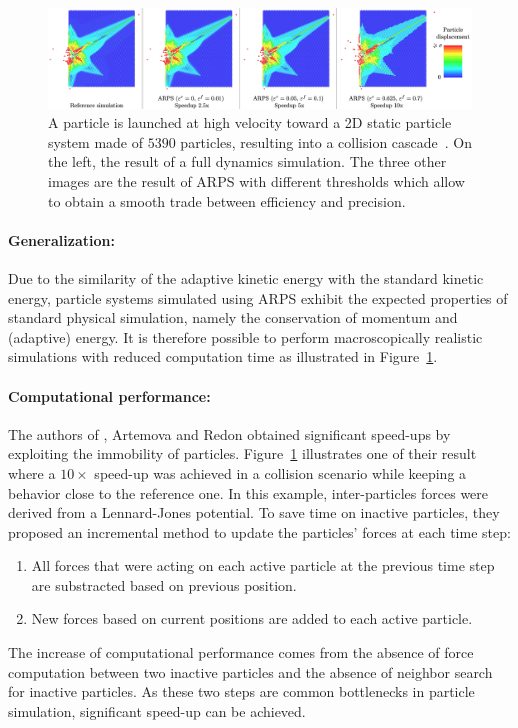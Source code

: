\begin{figure}[ht!]
  \centering
  \includegraphics[width=1.0\linewidth]{images/arps-vriphys2013/ARPS_Collision_Artemova.png}
  \caption[ARPS: Collision Cascade from \cite{Artemova2012}]{\label{fig:cascadeCollision} 
      A particle is launched at high velocity toward a 2D static particle system made of $5390$ particles, resulting into a collision cascade~\cite{Artemova2012}. 
 On the left, the result of a full dynamics simulation. 
 The three other images are the result of ARPS with different thresholds which allow to obtain a smooth trade between efficiency and precision.}
\end{figure}

\paragraph*{Generalization:}
Due to the similarity of the adaptive kinetic energy with the standard kinetic energy, particle systems simulated using ARPS exhibit the expected properties of standard physical simulation, namely the conservation of momentum and (adaptive) energy. It is therefore possible to perform macroscopically realistic simulations with reduced computation time as illustrated in Figure~\ref{fig:cascadeCollision}.

\paragraph*{Computational performance:}
The authors of \cite{Artemova2012}, Artemova and Redon obtained significant speed-ups by exploiting the immobility of particles. Figure~\ref{fig:cascadeCollision} illustrates one of their result where a $10\times$ speed-up was achieved in a collision scenario while keeping a behavior close to the reference one. In this example, inter-particles forces were derived from a Lennard-Jones potential. To save time on inactive particles, they proposed an incremental method to update the particles' forces at each time step:
\begin{enumerate}
    \item All forces that were acting on each active particle at the previous time step are substracted based on previous position.
    \item New forces based on current positions are added to each active particle.
\end{enumerate}
The increase of computational performance comes from the absence of force computation between
two inactive particles and the absence of neighbor search for inactive particles.
As these two steps are common bottlenecks in particle simulation, significant speed-up can be achieved.

